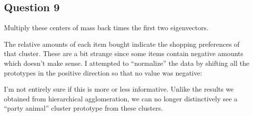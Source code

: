 \documentclass{math}
\begin{document}
\subsection*{Question 9}
Multiply these centers of mass back times the first two eigenvectors.
\begin{center}
\end{center}
The relative amounts of each item bought indicate the shopping preferences of
that cluster. These are a bit strange since some items contain negative amounts
which doesn't make sense. I attempted to ``normalize'' the data by shifting all
the prototypes in the positive direction so that no value was negative:
\begin{center}
\end{center}
I'm not entirely sure if this is more or less informative. Unlike the results
we obtained from hierarchical agglomeration, we can no longer distinctively see
a ``party animal'' cluster prototype from these clusters.
\end{document}
